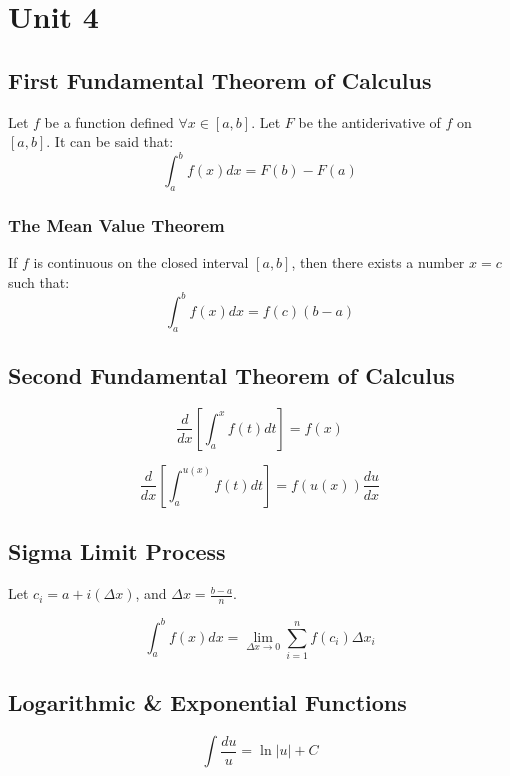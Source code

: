 \chapter{Unit 4}
\section{First Fundamental Theorem of Calculus}
Let $f$ be a function defined $\forall x\in[a,b]$. Let $F$ be the antiderivative
of $f$ on $[a,b]$. It can be said that:
\begin{equation}
  \int_{a}^{b} f(x) dx = F(b) - F(a)
\end{equation}

\subsection{The Mean Value Theorem}
If $f$ is continuous on the closed interval $[a,b]$, then there exists a number
$x=c$ such that:
\begin{equation}
  \int_{a}^{b} f(x)dx = f(c)(b-a)
\end{equation}

\section{Second Fundamental Theorem of Calculus}
\begin{equation}
  \frac{d}{dx}\left[\int_a^x f(t) dt\right]=f(x)
\end{equation}

\begin{equation}
  \frac{d}{dx}\left[ \int_a^{u(x)} f(t) dt\right] = f(u(x))\frac{du}{dx}
\end{equation}

\section{Sigma Limit Process}
Let $c_i = a+i(\Delta{x})$, and $\Delta{x}=\frac{b-a}{n}$.

\begin{equation}
  \int_a^b f(x) dx = \lim_{\Delta x\to 0} \sum_{i=1}^{n}f(c_i)\Delta{x_i}
\end{equation}

\section{Logarithmic \& Exponential Functions}
\begin{equation}
  \int \frac{du}{u} = \ln|u| + C
\end{equation}

